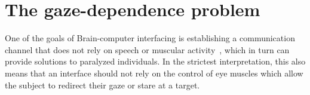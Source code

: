 

\section{The gaze-dependence problem}

One of the goals of Brain-computer interfacing is establishing a communication
channel that does not rely on speech or
muscular activity~\cite{Naci2012,Chaudhary2016}, which in turn can provide
solutions to paralyzed individuals.
In the strictest interpretation, this also means that an interface should not
rely on the control of eye muscles which allow the subject to redirect their
gaze or stare at a target.


